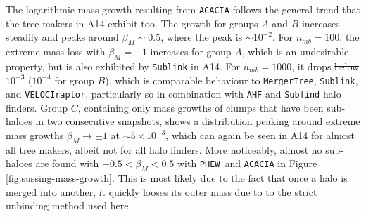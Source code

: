 \documentclass[a4paper,twocolumn,fleqn,usenatbib]{mnras}
\newcommand{\phew}{\texttt{PHEW}}
\providecommand{\DIFadd}[1]{{\protect\color{blue}\uwave{#1}}} %
\providecommand{\DIFdel}[1]{{\protect\color{red}\sout{#1}}}                      %
\providecommand{\DIFaddbegin}{} %
\providecommand{\DIFaddend}{} %
\providecommand{\DIFdelbegin}{} %
\providecommand{\DIFdelend}{} %
\newcommand{\DIFscaledelfig}{0.5}
\newlength{\DIFdelgraphicswidth} %
\newlength{\DIFdelgraphicsheight} %
\newcommand{\DIFaddincludegraphics}[2][]{{\color{blue}\fbox{\DIFOincludegraphics[#1]{#2}}}} %
\newcommand{\DIFdelincludegraphics}[2][]{%
\sbox{\DIFdelgraphicsbox}{\DIFOincludegraphics[#1]{#2}}%
\settoboxwidth{\DIFdelgraphicswidth}{\DIFdelgraphicsbox} %
\settoboxtotalheight{\DIFdelgraphicsheight}{\DIFdelgraphicsbox} %
\scalebox{\DIFscaledelfig}{%
\parbox[b]{\DIFdelgraphicswidth}{\usebox{\DIFdelgraphicsbox}\\[-\baselineskip] \rule{\DIFdelgraphicswidth}{0em}}\llap{\resizebox{\DIFdelgraphicswidth}{\DIFdelgraphicsheight}{%
\setlength{\unitlength}{\DIFdelgraphicswidth}%
\begin{picture}(1,1)%
\thicklines\linethickness{2pt} %
{\color[rgb]{1,0,0}\put(0,0){\framebox(1,1){}}}%
{\color[rgb]{1,0,0}\put(0,0){\line( 1,1){1}}}%
{\color[rgb]{1,0,0}\put(0,1){\line(1,-1){1}}}%
\end{picture}%
}\hspace*{3pt}}} %
} %
\DeclareRobustCommand{\DIFaddbegin}{\DIFOaddbegin \let\includegraphics\DIFaddincludegraphics} %
\DeclareRobustCommand{\DIFaddend}{\DIFOaddend \let\includegraphics\DIFOincludegraphics} %
\DeclareRobustCommand{\DIFdelbegin}{\DIFOdelbegin \let\includegraphics\DIFdelincludegraphics} %
\DeclareRobustCommand{\DIFdelend}{\DIFOaddend \let\includegraphics\DIFOincludegraphics} %
\begin{document}
The logarithmic mass growth resulting from \texttt{ACACIA} follows the general trend that the tree 
makers in A14 exhibit too. The growth for groups $A$ and $B$ increases steadily and peaks around 
$\beta_M \sim 0.5$, where the peak is \DIFdelbegin \DIFdel{$\sim 10^{-2}$}\DIFdelend \DIFaddbegin \DIFadd{$\sim2 \times 10^{-2}$}\DIFaddend . For $n_{mb} = 100$, the extreme mass 
loss  with $\beta_M = -1$ increases for group $A$, which is an undesirable property, but is also 
exhibited by \texttt{Sublink} in A14. For $n_{mb} = 1000$, it drops \DIFdelbegin \DIFdel{below }\DIFdelend \DIFaddbegin \DIFadd{to about }\DIFaddend $10^{-3}$ ($10^{-4}$ 
for group $B$), which is comparable behaviour to \texttt{MergerTree}, \texttt{Sublink}, and 
\texttt{VELOCIraptor}, particularly so in combination with \texttt{AHF} and \texttt{Subfind} halo 
finders. Group $C$, containing only mass growths of clumps that have been sub-haloes in two 
consecutive snapshots, shows a distribution peaking around extreme mass growths $\beta_M 
\rightarrow \pm 1$ at $\sim 5 \times 10^{-3}$, which can again be seen in A14 for almost all tree 
makers, albeit not for all halo finders. More noticeably, almost no sub-haloes are found with $-0.5 
< \beta_M < 0.5$ with \phew\ and \texttt{ACACIA} in Figure \ref{fig:sussing-mass-growth}.
This is \DIFdelbegin \DIFdel{most likely }\DIFdelend due to the fact that once a halo is merged into another, it quickly \DIFdelbegin \DIFdel{looses }\DIFdelend \DIFaddbegin \DIFadd{loses }\DIFaddend its 
outer mass due to \DIFdelbegin \DIFdel{to }\DIFdelend the strict unbinding method used here. %
\end{document}

